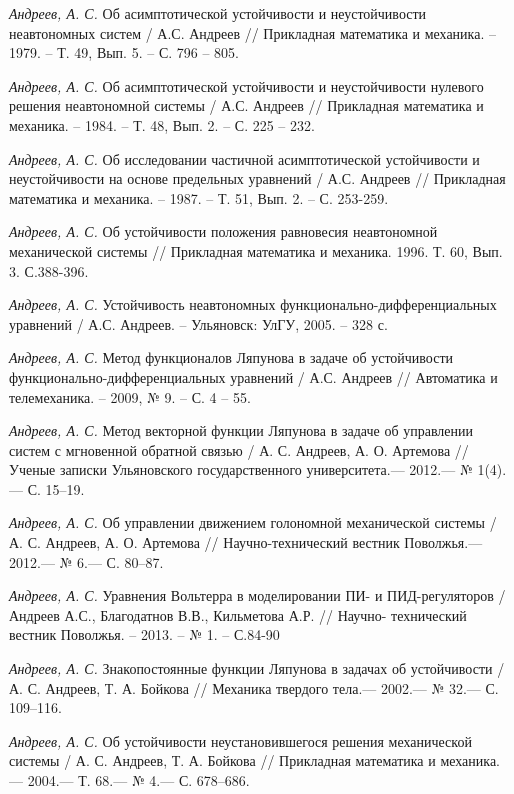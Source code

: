 \begin{thebibliography}{10}
	{\it Андреев, А. С.} Об асимптотической устойчивости и неустойчивости неавтономных систем / А.С. Андреев // Прикладная математика и механика. – 	1979. – Т. 49, Вып. 5. – С. 		796 – 805.
	
	{\it Андреев, А. С.} Об асимптотической устойчивости и неустойчивости нулевого решения неавтономной системы / А.С. Андреев // Прикладная 		математика и механика. – 1984. – Т. 	48, Вып. 2. – С. 225 – 232.	
	
	{\it Андреев, А. С.} Об исследовании частичной асимптотической устойчивости и неустойчивости на основе предельных уравнений / А.С. Андреев // 		Прикладная математика и механика. – 1987. – Т. 51, Вып. 2. – С. 253-259.
	
	{\it Андреев, А. С.} Об устойчивости положения равновесия неавтономной механической
	системы // Прикладная математика и механика. 1996. Т. 60, Вып. 3. С.388-396.

	{\it Андреев, А. С.} Устойчивость неавтономных функционально-дифференциальных уравнений / А.С. Андреев. – Ульяновск: УлГУ, 2005. – 328 с.

	{\it Андреев, А. С.} Метод функционалов Ляпунова в задаче об устойчивости функционально-дифференциальных уравнений / А.С. Андреев // Автоматика 	и телемеханика. – 2009, № 9. – С. 4 – 55.

	{\it Андреев, А. С.} Метод векторной функции Ляпунова в задаче об управлении систем 	
	с мгновенной обратной связью / А. С. Андреев, А. О. Артемова // Ученые записки
	Ульяновского государственного университета.— 2012.— № 1(4).— С. 15–19.
	
	{\it Андреев, А. С.} Об управлении движением голономной механической системы / А. С. Андреев,
	А. О. Артемова // Научно-технический вестник Поволжья.— 2012.— № 6.— С. 80–87.

	{\it Андреев, А. С.} Уравнения Вольтерра в моделировании ПИ- и ПИД-регуляторов / Андреев А.С., Благодатнов В.В., Кильметова А.Р. // Научно-		технический вестник Поволжья. – 2013. – № 1. – С.84-90
	
	{\it Андреев, А. С.} Знакопостоянные функции Ляпунова в задачах об устойчивости /
	А. С. Андреев, Т. А. Бойкова // Механика твердого тела.— 2002.— № 32.— С. 109–116.

	{\it Андреев, А. С.} Об устойчивости неустановившегося решения механической системы /
	А. С. Андреев, Т. А. Бойкова // Прикладная математика и механика.— 2004.— Т. 68.— № 4.— С. 678–686.


\end{thebibliography}
